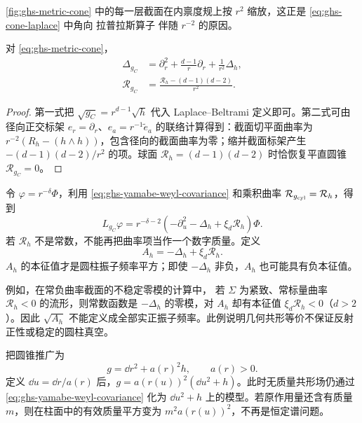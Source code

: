 \cref{fig:ghs-metric-cone} 中的每一层截面在内禀度规上按 $r^2$ 缩放，这正是 \cref{eq:ghs-cone-laplace} 中角向 拉普拉斯算子 伴随 $r^{-2}$ 的原因。

\begin{proposition}
\label{prop:ghs-cone-laplacian}
对 \cref{eq:ghs-metric-cone}，
\begin{align}
\Delta_{g_C}&=\partial_r^2+\frac{d-1}{r}\partial_r+\frac1{r^2}\Delta_h,
 \label{eq:ghs-cone-laplace}\\
\mathcal R_{g_C}&=\frac{\mathcal R_h-(d-1)(d-2)}{r^2}.
 \label{eq:ghs-cone-curvature}
\end{align}
\end{proposition}
\begin{proof}
第一式把 $\sqrt{g_C}=r^{d-1}\sqrt h$ 代入 Laplace–Beltrami 定义即可。第二式可由径向正交标架 $e_r=\partial_r$、$e_a=r^{-1}\widetilde e_a$ 的联络计算得到：截面切平面曲率为 $r^{-2}(R_h-(h\mathbin{\wedge}h))$，包含径向的截面曲率为零；缩并截面标架产生 $-(d-1)(d-2)/r^2$ 的项。球面 $\mathcal R_h=(d-1)(d-2)$ 时恰恢复平直圆锥 $\mathcal R_{g_C}=0$。
\end{proof}

令 $\varphi=r^{-\delta}\Phi$，利用 \cref{eq:ghs-yamabe-weyl-covariance} 和乘积曲率 $\mathcal R_{g_{\rm cyl}}=\mathcal R_h$，得到
\begin{equation}\label{eq:ghs-cone-yamabe-cylinder}
 L_{g_C}\varphi=r^{-\delta-2}
 \left(-\partial_u^2-\Delta_h+\xi_d\mathcal R_h\right)\Phi.
\end{equation}
若 $\mathcal R_h$ 不是常数，不能再把曲率项当作一个数字质量。定义
\begin{equation}\label{eq:ghs-cross-section-conformal-A}
 A_h=-\Delta_h+\xi_d\mathcal R_h.
\end{equation}
$A_h$ 的本征值才是圆柱振子频率平方；即使 $-\Delta_h$ 非负，$A_h$ 也可能具有负本征值。

例如，在常负曲率截面的不稳定零模的计算中，
若 $\Sigma$ 为紧致、常标量曲率 $\mathcal R_h<0$ 的流形，则常数函数是 $-\Delta_h$ 的零模，对 $A_h$ 却有本征值 $\xi_d\mathcal R_h<0$（$d>2$）。因此 $\sqrt{A_h}$ 不能定义成全部实正振子频率。此例说明几何共形等价不保证反射正性或稳定的圆柱真空。

把圆锥推广为
\[
 g=\dd r^2+a(r)^2h,
 \qquad a(r)>0.
\]
定义 $\dd u=\dd r/a(r)$ 后，$g=a(r(u))^2(\dd u^2+h)$。此时无质量共形场仍通过 \cref{eq:ghs-yamabe-weyl-covariance} 化为 $\dd u^2+h$ 上的模型。若原作用量还含有质量 $m$，则在柱面中的有效质量平方变为 $m^2a(r(u))^2$，不再是恒定谱问题。

